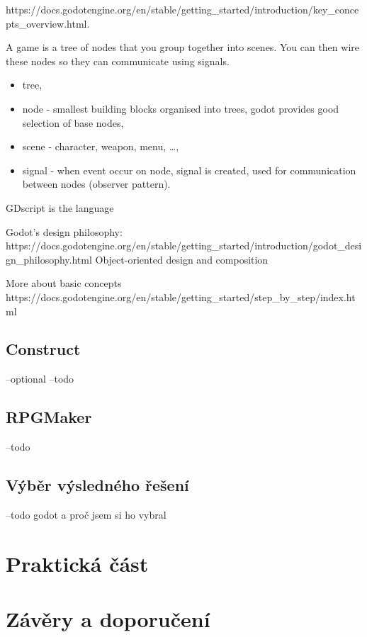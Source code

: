 https://docs.godotengine.org/en/stable/getting\_started/introduction/key\_concepts\_overview.html.

A game is a tree of nodes that you group together into scenes. You can then wire these nodes so they can communicate using signals.

\begin{itemize}
	\item tree,
	\item node - smallest building blocks organised into trees, godot provides good selection of base nodes,
	\item scene - character, weapon, menu, \ldots,
	\item  signal - when event occur on node, signal is created, used for communication between nodes (observer pattern).
\end{itemize}

GDscript is the language

Godot's design philosophy:
https://docs.godotengine.org/en/stable/getting\_started/introduction/godot\_design\_philosophy.html
Object-oriented design and composition

More about basic concepts
https://docs.godotengine.org/en/stable/getting\_started/step\_by\_step/index.html

\subsection{Construct}
--optional
--todo

\subsection{RPGMaker}
--todo

\subsection{Výběr výsledného řešení}
--todo godot a proč jsem si ho vybral


\section{Praktická část}



\section{Závěry a doporučení}

